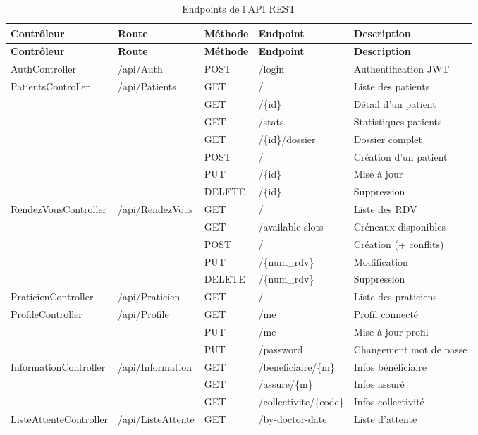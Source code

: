\begin{longtable}{@{} l l l l p{4.5cm} @{}}
\toprule
\textbf{Contrôleur} & \textbf{Route} & \textbf{Méthode} & \textbf{Endpoint} & \textbf{Description} \\
\midrule
\endfirsthead
\toprule
\textbf{Contrôleur} & \textbf{Route} & \textbf{Méthode} & \textbf{Endpoint} & \textbf{Description} \\
\midrule
\endhead
\bottomrule
\caption{Endpoints de l'API REST}
\label{tab:endpoints}
\endfoot
AuthController & /api/Auth & POST & /login & Authentification JWT \\
\midrule
PatientsController & /api/Patients & GET & / & Liste des patients \\
 & & GET & /\{id\} & Détail d'un patient \\
 & & GET & /stats & Statistiques patients \\
 & & GET & /\{id\}/dossier & Dossier complet \\
 & & POST & / & Création d'un patient \\
 & & PUT & /\{id\} & Mise à jour \\
 & & DELETE & /\{id\} & Suppression \\
\midrule
RendezVousController & /api/RendezVous & GET & / & Liste des RDV \\
 & & GET & /available-slots & Créneaux disponibles \\
 & & POST & / & Création (+ conflits) \\
 & & PUT & /\{num\_rdv\} & Modification \\
 & & DELETE & /\{num\_rdv\} & Suppression \\
\midrule
PraticienController & /api/Praticien & GET & / & Liste des praticiens \\
\midrule
ProfileController & /api/Profile & GET & /me & Profil connecté \\
 & & PUT & /me & Mise à jour profil \\
 & & PUT & /password & Changement mot de passe \\
\midrule
InformationController & /api/Information & GET & /beneficiaire/\{m\} & Infos bénéficiaire \\
 & & GET & /assure/\{m\} & Infos assuré \\
 & & GET & /collectivite/\{code\} & Infos collectivité \\
\midrule
ListeAttenteController & /api/ListeAttente & GET & /by-doctor-date & Liste d'attente \\
\end{longtable}

